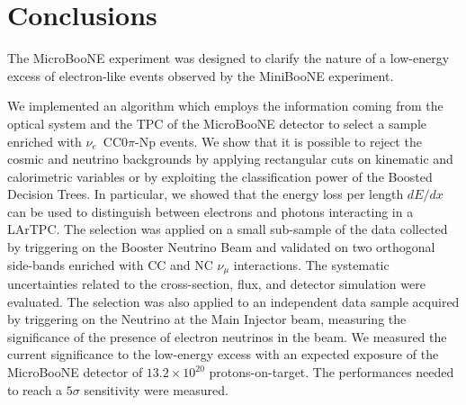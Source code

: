 \chapter{Conclusions}\label{ch:7-conclusions}
The MicroBooNE experiment was designed to clarify the nature of a low-energy excess of electron-like events observed by the MiniBooNE experiment. 

We implemented an algorithm which employs the information coming from the optical system and the TPC of the MicroBooNE detector to select a sample enriched with $\nu_e$~CC0$\pi$-Np events. We show that it is possible to reject the cosmic and neutrino backgrounds by applying rectangular cuts on kinematic and calorimetric variables or by exploiting the classification power of the Boosted Decision Trees. In particular, we showed that the energy loss per length $dE/dx$ can be used to distinguish between electrons and photons interacting in a LArTPC. The selection was applied on a small sub-sample of the data collected by triggering on the Booster Neutrino Beam and validated on two orthogonal side-bands enriched with CC and NC $\nu_{\mu}$ interactions. The systematic uncertainties related to the cross-section, flux, and detector simulation were evaluated. The selection was also applied to an independent data sample acquired by triggering on the Neutrino at the Main Injector beam, measuring the significance of the presence of electron neutrinos in the beam. 
We measured the current significance to the low-energy excess with an expected exposure of the MicroBooNE detector of $13.2\times10^{20}$ protons-on-target. The performances needed to reach a $5\sigma$ sensitivity were measured.

